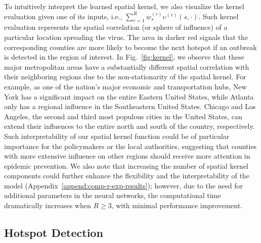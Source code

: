 \documentclass[journal]{IEEEtran}
\begin{document}
To intuitively interpret the learned spatial kernel, we also visualize the kernel evaluation given one of its inputs, i.e., $\sum_{r=1}^R w_{s}^{(r)} \upsilon^{(r)}(s, \cdot)$.
Such kernel evaluation represents the spatial correlation (or sphere of influence) of a particular location spreading the virus.
The area in darker red signals that the corresponding counties are more likely to become the next hotspot if an outbreak is detected in the region of interest. 
In Fig.~\ref{fig:kernel}, we observe that these major metropolitan areas have a substantially different spatial correlation with their neighboring regions due to the non-stationarity of the spatial kernel. 
For example,
as one of the nation’s major economic and transportation hubs, 
New York has a significant impact on the entire Eastern United States, while Atlanta only has a regional influence in the Southeastern United States. 
Chicago and Los Angeles, the second and third most populous cities in the United States, can extend their influences to the entire north and south of the country, respectively.
Such interpretability of our spatial kernel function could be of particular importance for the policymakers or the local authorities, suggesting that counties with more extensive influence on other regions should receive more attention in epidemic prevention. 
We also note that increasing the number of spatial kernel components could further enhance the flexibility and the interpretability of the model (Appendix~\ref{append:comp-r-exp-results}); however, due to the need for additional parameters in the neural networks, the computational time dramatically increases when $R \ge 3$, with minimal performance improvement.

\subsection{Hotspot Detection}
\end{document}
